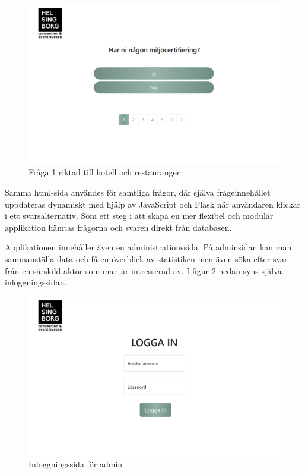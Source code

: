 \documentclass[12pt]{article}
\begin{document}
\begin{figure}[H]
    \centering
    \includegraphics[width=12cm]{question_page.png}
    \caption{Fråga 1 riktad till hotell och restauranger}
    \label{fig:question}
\end{figure}


Samma html-sida användes för samtliga frågor, där själva frågeinnehållet uppdateras dynamiskt med hjälp av JavaScript och Flask när användaren klickar i ett svarsalternativ. Som ett steg i att skapa en mer flexibel och modulär applikation hämtas frågorna och svaren direkt från databasen.

Applikationen innehåller även en administrationssida.
 På adminsidan kan man sammanställa data och få en överblick av statistiken men även söka efter svar från en särskild aktör som man är intresserad av. I figur \ref{fig:admin_login} nedan syns själva inloggningssidan.
 
 \begin{figure}[H]
    \centering
    \includegraphics[width=12cm]{admin_log_in.png}
    \caption{Inloggningssida för admin}
    \label{fig:admin_login}
\end{figure}
\end{document}
